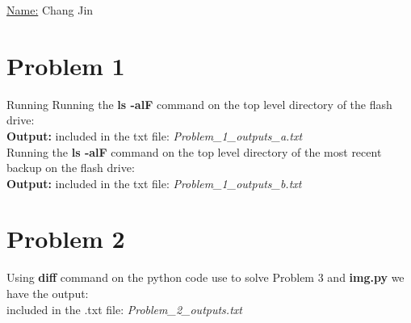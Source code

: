 \documentclass[20pt,letterpaper]{article}
\begin{document}
	\uline{Name:} Chang Jin
\section{Problem 1}
Running Running the \textbf{ls -alF} command on the top level directory of the flash drive:\\
\textbf{Output:} included in the txt file: \textit{Problem\_1\_outputs\_a.txt}\\
Running the \textbf{ls -alF} command on the top level directory of the most recent backup on the flash drive:\\
\textbf{Output:} included in the txt file: \textit{Problem\_1\_outputs\_b.txt}
\section{Problem 2}
Using \textbf{diff} command on the python code use to solve Problem 3 and \textbf{img.py} we have the output:\\
included in the .txt file: \textit{Problem\_2\_outputs.txt}
\end{document}
